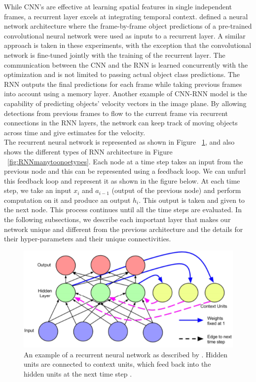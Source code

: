 While CNN's are effective at learning spatial features in single independent frames, a recurrent layer excels at integrating temporal context. \cite{tripathi2016context} defined a neural network architecture where the frame-by-frame object predictions of a pre-trained convolutional neural network were used as inputs to a recurrent layer. A similar approach is taken in these experiments, with the exception that the convolutional network is fine-tuned jointly with the training of the recurrent layer. The communication between the CNN and the RNN is learned concurrently with the optimization and is not limited to passing actual object class predictions. The RNN outputs the final predictions for each frame while taking previous frames into account using a memory layer. Another example of CNN-RNN model is the capability of predicting objects’ velocity vectors in the image plane. By allowing detections from previous frames to flow to the current frame via recurrent connections in the RNN layers, the network can keep track of moving objects across time and give estimates for the velocity.\\

The recurrent neural network is represented as shown in Figure ~\ref{fig:gap1}, and also shows the different types of RNN architecture in Figure ~\ref{fig:RNNmanytoonoetypes}. Each node at a time step takes an input from the previous node and this can be represented using a feedback loop. We can unfurl this feedback loop and represent it as shown in the figure below. At each time step, we take an input $x_{i}$ and $a_{i-1}$ (output of the previous node) and perform computation on it and produce an output $h_{i}$. This output is taken and given to the next node. This process continues until all the time steps are evaluated. In the following subsections, we describe each important layer that makes our network unique and different from the previous architecture and the details for their hyper-parameters and their unique connectivities.

\begin{figure}[ht]
\centering
\includegraphics[width=0.60\columnwidth]{Figures/rnn}
\decoRule
\caption[An example of a recurrent neural network as described by \cite{elman1990finding}. Hidden
units are connected to context units, which feed back into the hidden units at
the next time step \citep{lipton2015critical}.]{An example of a recurrent neural network as described by \cite{elman1990finding}. Hidden
units are connected to context units, which feed back into the hidden units at
the next time step \citep{lipton2015critical}.}
\label{fig:gap1}
\end{figure}


